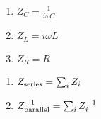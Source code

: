

\vspace*{\fill}
\centering

\begin{enumerate}
    \item $\displaystyle Z_{C} = \frac{1}{i \omega C}$ 
    \item $\displaystyle Z_{L} = i \omega L$
    \item $\displaystyle Z_{R} = R$
\end{enumerate}

\begin{enumerate}
    \item $Z_{\rm series} = \sum_{i} Z_{i}$
    \item $Z_{\rm parallel}^{-1} = \sum_{i} Z_{i}^{-1}$
\end{enumerate}

\centering
\vspace*{\fill}


